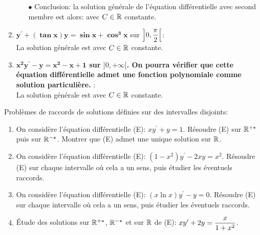 \documentclass[a4paper, 11pt,reqno]{article}
\begin{document}
\begin{correction}
\begin{enumerate}
\begin{itemize}
\item[$\bullet$] Conclusion: la solution g\'en\'erale de l'\'equation diff\'erentielle avec second membre est alors:   avec $C\in\mathbb{R}$ constante.
\end{itemize}
\item \textbf{$\mathbf{y^{\prime}+(\tan{x})y=\sin{x}+\cos^3{x}}$}  sur $\left\rbrack 0,\displaystyle\frac{\pi}{2}\right\lbrack$:\\
La solution g\'en\'erale est    avec $C \in\mathbb{R}$ constante.
\item \textbf{$\mathbf{x^2 y^{\prime}-y=x^2-x+1}$ sur $]0,+\infty[$. On pourra v\'erifier que cette \'equation diff\'erentielle admet une fonction polynomiale comme solution particuli\`ere.} :\\
La solution g\'en\'erale est    avec $C \in\mathbb{R}$ constante.
\end{enumerate}
\end{correction}
% 





\begin{exercice}  \; Probl\`emes de raccords de solutions d\'efinies sur des intervalles disjoints:
\begin{enumerate}
 \item On consid\`ere l'\'equation diff\'erentielle (E): $xy^{\prime}+y=1$. R\'esoudre (E) sur $\mathbb{R}^{+\star}$ puis sur $\mathbb{R}^{-\star}$. Montrer que (E) admet une unique solution sur $\mathbb{R}$.
\item On consid\`ere l'\'equation diff\'erentielle (E): $(1-x^2)y^{\prime}-2xy=x^2$. R\'esoudre (E) sur chaque intervalle o\`u cela a un sens, puis \'etudier les \'eventuels raccords.
\item On consid\`ere l'\'equation diff\'erentielle (E): $(x\ln{x})y^{\prime}-y=0$. R\'esoudre (E) sur chaque intervalle o\`u cela a un sens, puis \'etudier les \'eventuels raccords.
\item \'Etude des solutions sur $\mathbb{R}^{+\star}$, $\mathbb{R}^{-\star}$ et sur $\mathbb{R}$ de (E): $xy^{\prime}+2y=\displaystyle\frac{x}{1+x^2}$. \\
\end{enumerate}
\end{exercice}
\end{document}
